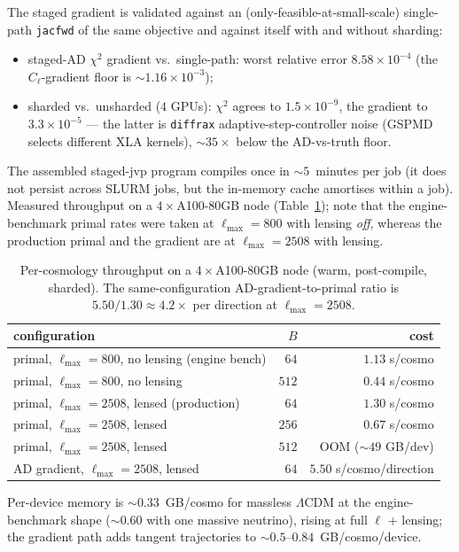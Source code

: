 \documentclass[11pt]{article}
\newcommand{\code}[1]{\texttt{\small #1}}
\newcommand{\Cl}{C_\ell}
\newcommand{\chisq}{\chi^2}
\newcommand{\Lmax}{\ell_{\max}}
\begin{document}
The staged gradient is validated against an (only-feasible-at-small-scale)
single-path \code{jacfwd} of the same objective and against itself with
and without sharding:
\begin{itemize}[leftmargin=1.5em,itemsep=1pt]
\item staged-AD $\chisq$ gradient vs.\ single-path: worst relative error
$8.58\times10^{-4}$ (the $\Cl$-gradient floor is $\sim1.16\times10^{-3}$);
\item sharded vs.\ unsharded ($4$ GPUs): $\chisq$ agrees to
$1.5\times10^{-9}$, the gradient to $3.3\times10^{-5}$ --- the latter is
\code{diffrax} adaptive-step-controller noise (GSPMD selects different XLA
kernels), $\sim35\times$ below the AD-vs-truth floor.
\end{itemize}
The assembled staged-jvp program compiles once in $\sim5$~minutes per job
(it does not persist across SLURM jobs, but the in-memory cache amortises
within a job). Measured throughput on a $4\times$A100-80GB node
(Table~\ref{tab:throughput}); note that the engine-benchmark primal rates
were taken at $\Lmax=800$ with lensing \emph{off}, whereas the production
primal and the gradient are at $\Lmax=2508$ with lensing.

\begin{table}[h]
\centering
\caption{Per-cosmology throughput on a $4\times$A100-80GB node (warm,
post-compile, sharded). The same-configuration AD-gradient-to-primal ratio
is $5.50/1.30\approx4.2\times$ per direction at $\Lmax=2508$.}
\label{tab:throughput}
\begin{tabular}{lrr}
\toprule
configuration & $B$ & cost \\
\midrule
primal, $\Lmax=800$, no lensing (engine bench) & $64$ & $1.13$ s/cosmo \\
primal, $\Lmax=800$, no lensing & $512$ & $0.44$ s/cosmo \\
primal, $\Lmax=2508$, lensed (production) & $64$ & $1.30$ s/cosmo \\
primal, $\Lmax=2508$, lensed & $256$ & $0.67$ s/cosmo \\
primal, $\Lmax=2508$, lensed & $512$ & OOM ($\sim49$ GB/dev) \\
AD gradient, $\Lmax=2508$, lensed & $64$ & $5.50$ s/cosmo/direction \\
\bottomrule
\end{tabular}
\end{table}

Per-device memory is $\sim0.33$~GB/cosmo for massless $\Lambda$CDM at the
engine-benchmark shape ($\sim0.60$ with one massive neutrino), rising at
full $\ell$ + lensing; the gradient path adds tangent trajectories to
$\sim0.5$--$0.84$~GB/cosmo/device.
\end{document}
